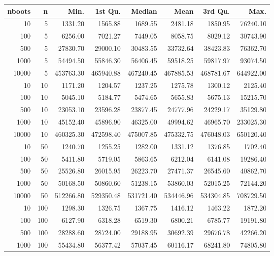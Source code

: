 \begin{table}[ht]
\centering
\begin{tabular}{rrrrrrrr}
  \hline
nboots & n & Min. & 1st Qu. & Median & Mean & 3rd Qu. & Max. \\ 
  \hline
10 & 5 & 1331.20 & 1565.88 & 1689.55 & 2481.18 & 1850.95 & 76240.10 \\ 
  100 & 5 & 6256.00 & 7021.27 & 7449.05 & 8058.75 & 8029.12 & 30743.90 \\ 
  500 & 5 & 27830.70 & 29000.10 & 30483.55 & 33732.64 & 38423.83 & 76362.70 \\ 
  1000 & 5 & 54494.50 & 55846.30 & 56406.45 & 59518.25 & 59817.97 & 93074.50 \\ 
  10000 & 5 & 453763.30 & 465940.88 & 467240.45 & 467885.53 & 468781.67 & 644922.00 \\ 
  10 & 10 & 1171.20 & 1204.57 & 1237.25 & 1275.78 & 1300.12 & 2125.40 \\ 
  100 & 10 & 5045.10 & 5184.77 & 5474.65 & 5655.83 & 5675.13 & 15215.70 \\ 
  500 & 10 & 23053.10 & 23596.28 & 23877.45 & 24777.96 & 24229.17 & 35129.80 \\ 
  1000 & 10 & 45152.40 & 45896.90 & 46325.00 & 49994.62 & 46965.70 & 233025.30 \\ 
  10000 & 10 & 460325.30 & 472598.40 & 475007.85 & 475332.75 & 476048.03 & 650120.40 \\ 
  10 & 50 & 1240.70 & 1255.25 & 1282.00 & 1331.12 & 1376.85 & 1702.40 \\ 
  100 & 50 & 5411.80 & 5719.05 & 5863.65 & 6212.04 & 6141.08 & 19286.40 \\ 
  500 & 50 & 25526.80 & 26015.95 & 26223.70 & 27471.37 & 26545.60 & 40862.70 \\ 
  1000 & 50 & 50168.50 & 50860.60 & 51238.15 & 53860.03 & 52015.25 & 72144.20 \\ 
  10000 & 50 & 512266.80 & 529350.48 & 531721.40 & 534446.96 & 534304.85 & 708729.50 \\ 
  10 & 100 & 1298.30 & 1326.75 & 1367.75 & 1416.12 & 1463.22 & 1872.20 \\ 
  100 & 100 & 6127.90 & 6318.28 & 6519.30 & 6800.21 & 6785.77 & 19191.80 \\ 
  500 & 100 & 28288.60 & 28724.00 & 29188.95 & 30692.39 & 29676.78 & 42266.20 \\ 
  1000 & 100 & 55434.80 & 56377.42 & 57037.45 & 60116.17 & 68241.80 & 74805.80 \\ 

\end{tabular}
\end{table}
